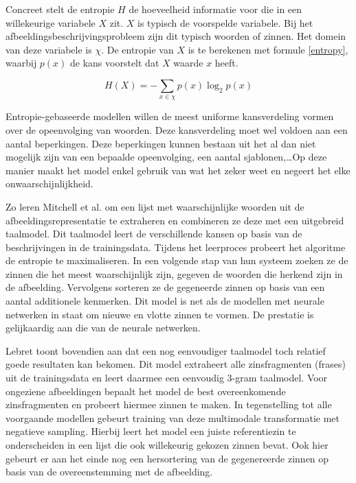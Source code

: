 Concreet stelt de entropie $H$ de hoeveelheid informatie voor die in een willekeurige variabele $X$ zit. $X$ is typisch de voorspelde variabele. Bij het afbeeldingsbeschrijvingsprobleem zijn dit typisch woorden of zinnen. Het domein van deze variabele is $\chi$. De entropie van $X$ is te berekenen met formule \eqref{entropy}, waarbij $p(x)$ de kans voorstelt dat $X$ waarde $x$ heeft\cite{Jurafsky:2009:SLP:1214993}. 

\begin{equation}
     H(X) = -\sum_{x \in \chi}p(x)\log_2p(x)
     \label{entropy}
 \end{equation} 

Entropie-gebaseerde modellen willen de meest uniforme kansverdeling vormen over de opeenvolging van woorden. Deze kansverdeling moet wel voldoen aan een aantal beperkingen. Deze beperkingen kunnen bestaan uit het al dan niet mogelijk zijn van een bepaalde opeenvolging, een aantal sjablonen,\ldots Op deze manier maakt het model enkel gebruik van wat het zeker weet en negeert het elke onwaarschijnlijkheid. 

Zo leren Mitchell et al.\cite{Mitchell2015} om een lijst met waarschijnlijke woorden uit de afbeeldingsrepresentatie te extraheren en combineren ze deze met een uitgebreid taalmodel. Dit taalmodel leert de verschillende kansen op basis van de beschrijvingen in de trainingsdata. Tijdens het leerproces probeert het algoritme de entropie te maximaliseren. In een volgende stap van hun systeem zoeken ze de zinnen die het meest waarschijnlijk zijn, gegeven de woorden die herkend zijn in de afbeelding. Vervolgens sorteren ze de gegeneerde zinnen op basis van een aantal additionele kenmerken. Dit model is net als de modellen met neurale netwerken in staat om nieuwe en vlotte zinnen te vormen. De prestatie is gelijkaardig aan die van de neurale netwerken.

Lebret\cite{Lebret2015} toont bovendien aan dat een nog eenvoudiger taalmodel toch relatief goede resultaten kan bekomen. Dit model extraheert alle zinsfragmenten (frases) uit de trainingsdata en leert daarmee een eenvoudig 3-gram taalmodel. Voor ongeziene afbeeldingen bepaalt het model de best overeenkomende zinsfragmenten en probeert hiermee zinnen te maken. In tegenstelling tot alle voorgaande modellen gebeurt training van deze multimodale transformatie met negatieve sampling. Hierbij leert het model een juiste referentiezin te onderscheiden in een lijst die ook willekeurig gekozen zinnen bevat. Ook hier gebeurt er aan het einde nog een hersortering van de gegenereerde zinnen op basis van de overeenstemming met de afbeelding.

